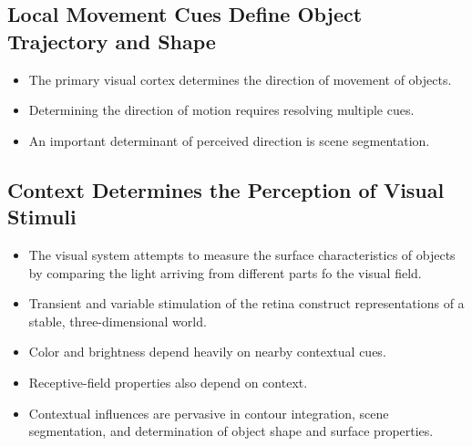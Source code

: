 \documentclass[12pt,a4paper]{article}
\begin{document}
\subsection{Local Movement Cues Define Object Trajectory and Shape}
\begin{itemize}
    \item The primary visual cortex determines the direction of movement of objects.
    \item Determining the direction of motion requires resolving multiple cues.
    \item An important determinant of perceived direction is scene segmentation. 
\end{itemize}

\subsection{Context Determines the Perception of Visual Stimuli}
\begin{itemize}
    \item The visual system attempts to measure the surface characteristics of objects by comparing the light arriving from different parts fo the visual field. 
    \item Transient and variable stimulation of the retina construct representations of a stable, three-dimensional world.
    \item Color and brightness depend heavily on nearby contextual cues.
    \item Receptive-field properties also depend on context.
    \item Contextual influences are pervasive in contour integration, scene segmentation, and determination of object shape and surface properties.
\end{itemize}
\end{document}
